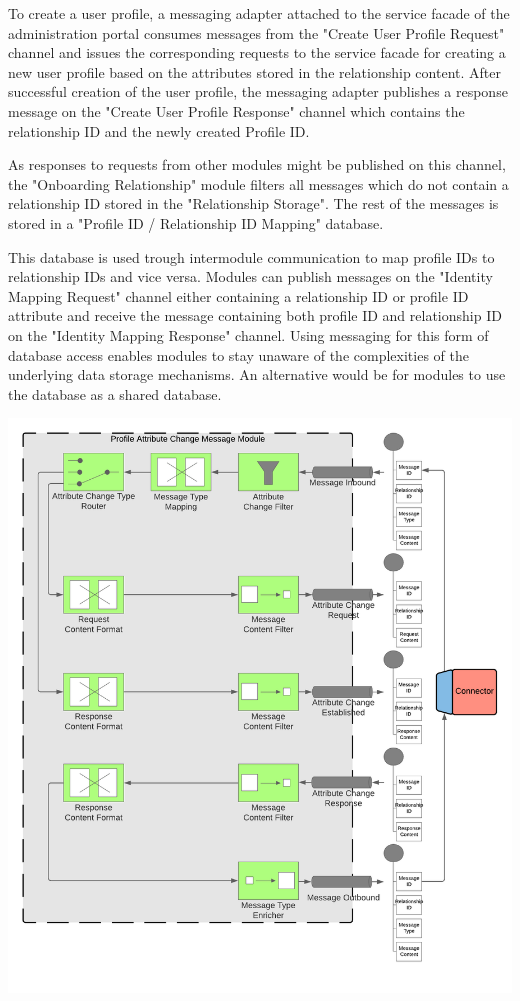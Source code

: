 To create a user profile, a messaging adapter attached to the service facade of the administration portal consumes messages from the "Create User Profile Request" channel and issues the corresponding requests to the service facade for creating a new user profile based on the attributes stored in the relationship content. After successful creation of the user profile, the messaging adapter publishes a response message on the "Create User Profile Response" channel which contains the relationship ID and the newly created Profile ID.

As responses to requests from other modules might be published on this channel, the "Onboarding Relationship" module filters all messages which do not contain a relationship ID stored in the "Relationship Storage". The rest of the messages is stored in a "Profile ID / Relationship ID Mapping" database. 

This database is used trough intermodule communication to map profile IDs to relationship IDs and vice versa. Modules can publish messages on the "Identity Mapping Request" channel either containing a relationship ID or profile ID attribute and receive the message containing both profile ID and relationship ID on the "Identity Mapping Response" channel. Using messaging for this form of database access enables modules to stay unaware of the complexities of the underlying data storage mechanisms. An alternative would be for modules to use the database as a shared database.

\begin{center}
    \includegraphics[scale=0.6]{Diagrams/Integration Architecture 1/Technological Integration/9. Attribute Change Message Module.pdf}
\end{center}

